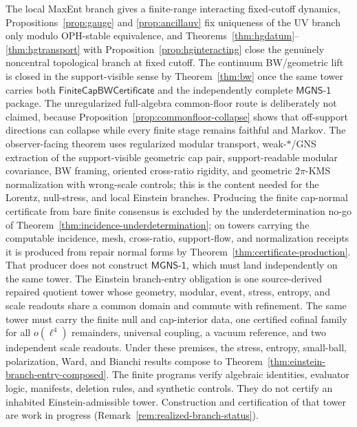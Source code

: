 \documentclass[11pt]{article}
\begin{document}
The local MaxEnt branch gives a finite-range interacting fixed-cutoff dynamics, Propositions~\ref{prop:gauge} and \ref{prop:ancillauv} fix uniqueness of the UV branch only modulo OPH-stable equivalence, and Theorems~\ref{thm:hgdatum}--\ref{thm:hgtransport} with Proposition~\ref{prop:hginteracting} close the genuinely noncentral topological branch at fixed cutoff. The continuum BW/geometric lift is closed in the support-visible sense by Theorem~\ref{thm:bw} once the same tower carries both \(\mathsf{FiniteCapBWCertificate}\) and the independently complete \(\mathsf{MGNS\text{-}1}\) package. The unregularized full-algebra common-floor route is deliberately not claimed, because Proposition~\ref{prop:commonfloor-collapse} shows that off-support directions can collapse while every finite stage remains faithful and Markov. The observer-facing theorem uses regularized modular transport, weak-\(*\)/GNS extraction of the support-visible geometric cap pair, support-readable modular covariance, BW framing, oriented cross-ratio rigidity, and geometric \(2\pi\)-KMS normalization with wrong-scale controls; this is the content needed for the Lorentz, null-stress, and local Einstein branches. Producing the finite cap-normal certificate from bare finite consensus is excluded by the underdetermination no-go of Theorem~\ref{thm:incidence-underdetermination}; on towers carrying the computable incidence, mesh, cross-ratio, support-flow, and normalization receipts it is produced from repair normal forms by Theorem~\ref{thm:certificate-production}. That producer does not construct \(\mathsf{MGNS\text{-}1}\), which must land independently on the same tower. The Einstein branch-entry obligation is one source-derived repaired quotient tower whose geometry, modular, event, stress, entropy, and scale readouts share a common domain and commute with refinement. The same tower must carry the finite null and cap-interior data, one certified cofinal family for all \(o(\ell^4)\) remainders, universal coupling, a vacuum reference, and two independent scale readouts. Under these premises, the stress, entropy, small-ball, polarization, Ward, and Bianchi results compose to Theorem~\ref{thm:einstein-branch-entry-composed}. The finite programs verify algebraic identities, evaluator logic, manifests, deletion rules, and synthetic controls. They do not certify an inhabited Einstein-admissible tower. Construction and certification of that tower are work in progress (Remark~\ref{rem:realized-branch-status}).
\end{document}
